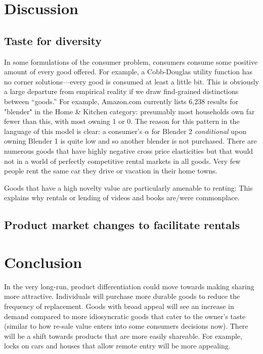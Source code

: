 \documentclass[11pt]{article}
\begin{document}
\section{Discussion} 
 
\subsection{Taste for diversity} 
In some formulations of the consumer problem, consumers consume some positive amount of every good offered.
For example, a Cobb-Douglas utility function has no corner solutions---every good is consumed at least a little bit.
This is obviously a large departure from empirical reality if we draw find-grained distinctions between ``goods.'' 
For example, Amazon.com currently lists 6,238 results for "blender" in the Home \& Kitchen category: 
presumably most households own far fewer than this, with most owning 1 or 0.
The reason for this pattern in the language of this model is clear: 
a consumer's $\alpha$ for Blender 2 \emph{conditional} upon owning Blender 1 is quite low and so another blender is not purchased.   
There are numerous goods that have highly negative cross price elasticities but that would not in a world of perfectly competitive rental markets in all goods.  
Very few people rent the same car they drive or vacation in their home towns. 
   

Goods that have a high novelty value are particularly amenable to renting: 
This explains why rentals or lending of videos and books are/were commonplace.  

\subsection{Product market changes to facilitate rentals} 

\section{Conclusion}
In the very long-run, product differentiation could move towards making sharing more attractive. 
Individuals will purchase more durable goods to reduce the frequency of replacement. 
Goods with broad appeal will see an increase in demand compared to more idiosyncratic goods that cater to the owner's taste (similar to how re-sale value enters into some consumers decisions now). 
There will be a shift towards products that are more easily shareable. 
For example, locks on cars and houses that allow remote entry will be more appealing. 
\end{document}
